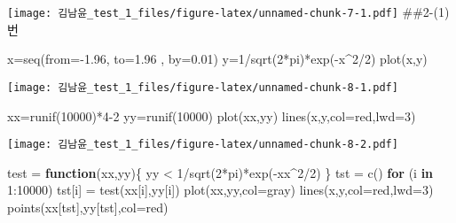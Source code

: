 \documentclass[
  12pt,
]{article}
\newenvironment{Shaded}{\begin{snugshade}}{\end{snugshade}}
\newcommand{\AttributeTok}[1]{\textcolor[rgb]{0.77,0.63,0.00}{#1}}
\newcommand{\ControlFlowTok}[1]{\textcolor[rgb]{0.13,0.29,0.53}{\textbf{#1}}}
\newcommand{\DecValTok}[1]{\textcolor[rgb]{0.00,0.00,0.81}{#1}}
\newcommand{\FloatTok}[1]{\textcolor[rgb]{0.00,0.00,0.81}{#1}}
\newcommand{\FunctionTok}[1]{\textcolor[rgb]{0.00,0.00,0.00}{#1}}
\newcommand{\NormalTok}[1]{#1}
\newcommand{\OtherTok}[1]{\textcolor[rgb]{0.56,0.35,0.01}{#1}}
\newcommand{\SpecialCharTok}[1]{\textcolor[rgb]{0.00,0.00,0.00}{#1}}
\newcommand{\StringTok}[1]{\textcolor[rgb]{0.31,0.60,0.02}{#1}}
\begin{document}
\texttt{[image: 김남윤\_test\_1\_files/figure-latex/unnamed-chunk-7-1.pdf]}
\#\#2-(1)번

\begin{Shaded}
\begin{Highlighting}[]
\NormalTok{x}\OtherTok{=}\FunctionTok{seq}\NormalTok{(}\AttributeTok{from=}\SpecialCharTok{{-}}\FloatTok{1.96}\NormalTok{, }\AttributeTok{to=}\FloatTok{1.96}\NormalTok{ , }\AttributeTok{by=}\FloatTok{0.01}\NormalTok{)}
\NormalTok{y}\OtherTok{=}\DecValTok{1}\SpecialCharTok{/}\FunctionTok{sqrt}\NormalTok{(}\DecValTok{2}\SpecialCharTok{*}\NormalTok{pi)}\SpecialCharTok{*}\FunctionTok{exp}\NormalTok{(}\SpecialCharTok{{-}}\NormalTok{x}\SpecialCharTok{\^{}}\DecValTok{2}\SpecialCharTok{/}\DecValTok{2}\NormalTok{)}
\FunctionTok{plot}\NormalTok{(x,y)}
\end{Highlighting}
\end{Shaded}

\texttt{[image: 김남윤\_test\_1\_files/figure-latex/unnamed-chunk-8-1.pdf]}

\begin{Shaded}
\begin{Highlighting}[]
\NormalTok{xx}\OtherTok{=}\FunctionTok{runif}\NormalTok{(}\DecValTok{10000}\NormalTok{)}\SpecialCharTok{*}\DecValTok{4{-}2}
\NormalTok{yy}\OtherTok{=}\FunctionTok{runif}\NormalTok{(}\DecValTok{10000}\NormalTok{)}
\FunctionTok{plot}\NormalTok{(xx,yy)}
\FunctionTok{lines}\NormalTok{(x,y,}\AttributeTok{col=}\StringTok{\textquotesingle{}red\textquotesingle{}}\NormalTok{,}\AttributeTok{lwd=}\DecValTok{3}\NormalTok{)}
\end{Highlighting}
\end{Shaded}

\texttt{[image: 김남윤\_test\_1\_files/figure-latex/unnamed-chunk-8-2.pdf]}

\begin{Shaded}
\begin{Highlighting}[]
\NormalTok{test }\OtherTok{=} \ControlFlowTok{function}\NormalTok{(xx,yy)\{}
\NormalTok{    yy }\SpecialCharTok{\textless{}} \DecValTok{1}\SpecialCharTok{/}\FunctionTok{sqrt}\NormalTok{(}\DecValTok{2}\SpecialCharTok{*}\NormalTok{pi)}\SpecialCharTok{*}\FunctionTok{exp}\NormalTok{(}\SpecialCharTok{{-}}\NormalTok{xx}\SpecialCharTok{\^{}}\DecValTok{2}\SpecialCharTok{/}\DecValTok{2}\NormalTok{)}
\NormalTok{    \}}
\NormalTok{tst }\OtherTok{=} \FunctionTok{c}\NormalTok{()}
\ControlFlowTok{for}\NormalTok{ (i }\ControlFlowTok{in} \DecValTok{1}\SpecialCharTok{:}\DecValTok{10000}\NormalTok{) tst[i] }\OtherTok{=} \FunctionTok{test}\NormalTok{(xx[i],yy[i])}
\FunctionTok{plot}\NormalTok{(xx,yy,}\AttributeTok{col=}\StringTok{\textquotesingle{}gray\textquotesingle{}}\NormalTok{)}
\FunctionTok{lines}\NormalTok{(x,y,}\AttributeTok{col=}\StringTok{\textquotesingle{}red\textquotesingle{}}\NormalTok{,}\AttributeTok{lwd=}\DecValTok{3}\NormalTok{)}
\FunctionTok{points}\NormalTok{(xx[tst],yy[tst],}\AttributeTok{col=}\StringTok{\textquotesingle{}red\textquotesingle{}}\NormalTok{)}
\end{Highlighting}
\end{Shaded}
\end{document}
